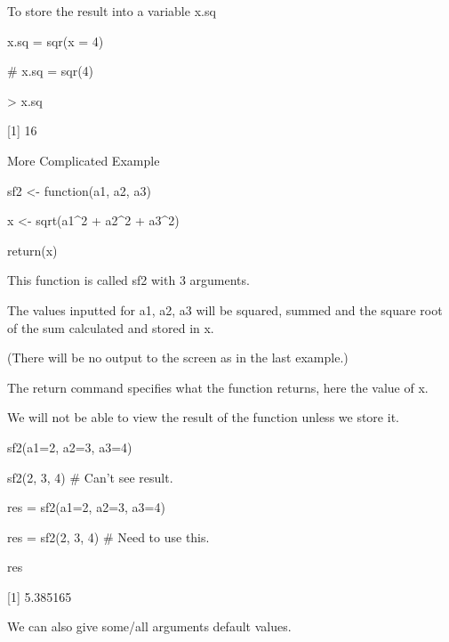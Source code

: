To store the result into a variable x.sq








x.sq = sqr(x = 4)


 # x.sq = sqr(4)


> x.sq


[1] 16
 




More Complicated Example








sf2 <- function(a1, a2, a3){


x <- sqrt(a1^2 + a2^2 + a3^2)


return(x)


}

 
 





This function is called sf2 with 3 arguments. 

The values inputted for a1, a2, a3 will be squared, summed and the square root of the sum calculated and stored in x. 

(There will be no output to the screen as in the last example.)

The return command specifies what the function returns, here the value of x. 

We will not be able to view the result of the function unless we store it.









sf2(a1=2, a2=3, a3=4)


sf2(2, 3, 4)                                                 # Can't see result.


res = sf2(a1=2, a2=3, a3=4)


res = sf2(2, 3, 4)                                        # Need to use this.


res


[1] 5.385165
 




We can also give some/all arguments default values.









